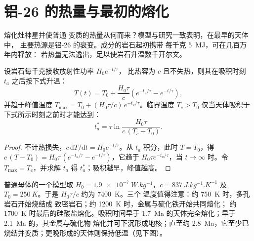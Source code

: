 \section{铝-26 的热量与最初的熔化}

熔化灶神星并使普通
变质的热量从何而来？模型与研究一致表明，在最早的天体中，
主要热源是铝-26 的衰变。成分的岩石起初携带
每千克 \qty{5}{MJ}，可在几百万年内释放：
若热量无法逸出，足以使岩石升温数千开尔文。

\begin{proposition}[铝-26 对星子的加热]
\label{prop:b2:planet-formation-meteorites:heating}
设岩石每千克接收放射性功率 $H_0 e^{-t/\tau}$，
比热容为 $c$ 且不失热，则其在吸积时刻
$t_a$ 之后按下式升温：
\[
  T(t) = T_0 + \frac{H_0\tau}{c}\left(e^{-t_a/\tau} - e^{-t/\tau}\right),
\]
并趋于峰值温度
$T_{\max} = T_0 + (H_0\tau/c)\,e^{-t_a/\tau}$。临界温度
$T_c > T_0$ 仅当天体吸积于下式所示时刻之前时才能达到：
\[
  t_a^* = \tau\ln\frac{H_0\tau}{c\,(T_c - T_0)}.
\]
\end{proposition}

\begin{proof}
不计热损失，$c\,\mathrm dT/\mathrm dt = H_0 e^{-t/\tau}$。从
$t_a$ 积分，此时 $T = T_0$，得
$c\,(T - T_0) = H_0\tau\,(e^{-t_a/\tau} - e^{-t/\tau})$，它趋于
$H_0\tau e^{-t_a/\tau}$，当 $t \to \infty$ 时。令 $T_{\max} = T_c$，并求解
$t_a$ 得 $t_a^*$；吸积越早，峰值越高。
\end{proof}

普通母体的一个模型取
$H_0 = \qty{1.9e-7}{W.kg^{-1}}$，$c = \qty{837}{J.kg^{-1}.K^{-1}}$ 及
$T_0 = \qty{250}{K}$。于是 $H_0\tau/c$ 约为 \qty{7400}{K}。三个
温度值得注意：约 \qty{750}{K} 时，多孔岩石开始烧结成
致密岩石；约 \qty{1200}{K} 时，金属与硫化铁开始共同熔化；
约 \qty{1700}{K} 时最后的硅酸盐熔化。吸积时间早于
\qty{1.7}{Ma} 的天体完全熔化；早于 \qty{2.1}{Ma} 的，其金属与硫化物
熔化并可下沉形成地核；直至约 \qty{2.8}{Ma}，它至少已
烧结并变质；更晚形成的天体则保持低温（见下图）。

